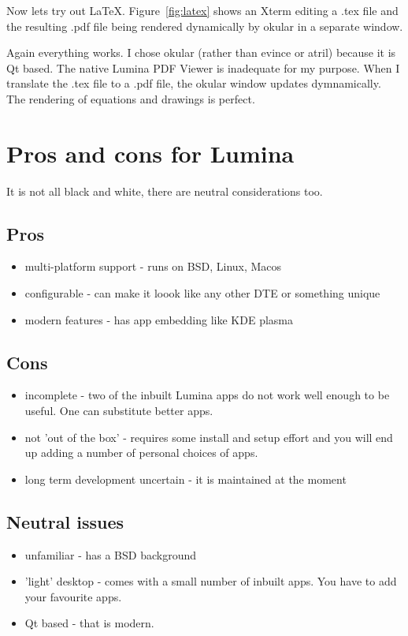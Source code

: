 \documentclass{article}  %
\begin{document}
{Now lets try out \LaTeX. Figure~\ref{fig:latex} shows an Xterm editing a .tex file and the resulting .pdf file being rendered dynamically by okular in a separate window.

Again everything works. I chose okular (rather than evince or atril) because it is Qt based. The native Lumina PDF Viewer is inadequate for my purpose. When I translate the .tex file to a .pdf file, the okular window updates dymnamically. The rendering of equations and drawings is perfect. 

\section{Pros and cons for Lumina}
It is not all black and white, there are neutral considerations too.
\subsection{Pros}
\begin{itemize}
\item multi-platform support - runs on BSD, Linux, Macos
\item configurable - can make it loook like any other DTE or something unique
\item modern features - has app embedding like KDE plasma
\end{itemize}

\subsection{Cons}
\begin{itemize}
\item incomplete - two of the inbuilt Lumina apps do not work well enough to be useful. One can substitute better apps.
\item not 'out of the box' - requires some install and setup effort and you will end up adding a number of personal choices of apps.
\item long term development uncertain - it is maintained at the moment
\end{itemize}

\subsection{Neutral issues}
\begin{itemize}
\item unfamiliar - has a BSD background 
\item 'light' desktop - comes with a small number of inbuilt apps. You have to add your favourite apps.
\item  Qt based - that is modern.
\end{itemize}

}
\end{document}
